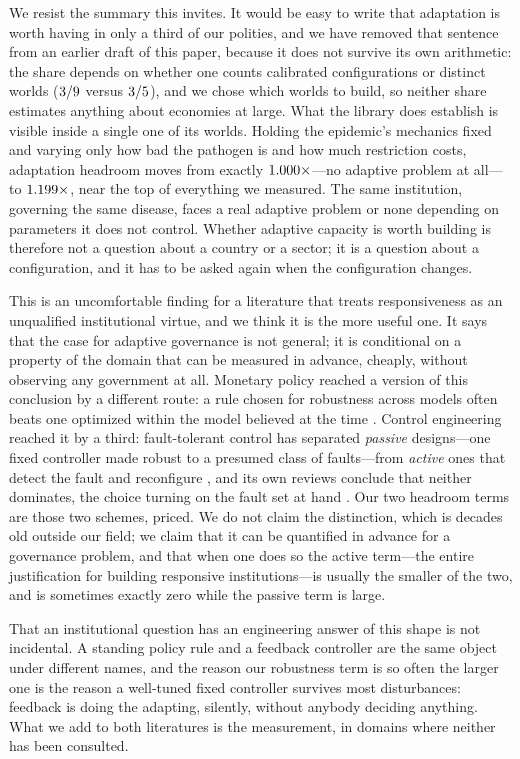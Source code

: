 \documentclass[11pt]{article}
\begin{document}
We resist the summary this invites. It would be easy to write that adaptation is worth having in
only a third of our polities, and we have removed that sentence from an earlier draft of this paper,
because it does not survive its own arithmetic: the share depends on whether one counts calibrated
configurations or distinct worlds ($3/9$ versus $3/5$), and we chose which worlds
to build, so neither share estimates anything about economies at large. What the library does
establish is visible inside a single one of its worlds. Holding the epidemic's mechanics fixed and
varying only how bad the pathogen is and how much restriction costs, adaptation headroom moves from
exactly $1.000\times$---no adaptive problem at all---to $1.199\times$, near the top of
everything we measured. The same institution, governing the same disease, faces a real adaptive
problem or none depending on parameters it does not control. Whether adaptive capacity is worth
building is therefore not a question about a country or a sector; it is a question about a
configuration, and it has to be asked again when the configuration changes.

This is an uncomfortable finding for a literature that treats responsiveness as an unqualified
institutional virtue, and we think it is the more useful one. It says that the case for adaptive
governance is not general; it is conditional on a property of the domain that can be measured in
advance, cheaply, without observing any government at all. Monetary policy reached a version of this
conclusion by a different route: a rule chosen for robustness across models often beats one optimized
within the model believed at the time \citep{levin1999robustness}. Control engineering reached it by
a third: fault-tolerant control has separated \emph{passive} designs---one fixed controller made
robust to a presumed class of faults---from \emph{active} ones that detect the fault and reconfigure
\citep{zhang2008reconfigurable}, and its own reviews conclude that neither dominates, the choice
turning on the fault set at hand \citep{jiang2012comparative}. Our two headroom terms are those two
schemes, priced. We do not claim the distinction, which is decades old outside our field; we claim
that it can be quantified in advance for a governance problem, and that when one does so the active
term---the entire justification for building responsive institutions---is usually the smaller of the
two, and is sometimes exactly zero while the passive term is large.

That an institutional question has an engineering answer of this shape is not incidental. A standing
policy rule and a feedback controller are the same object under different names, and the reason our
robustness term is so often the larger one is the reason a well-tuned fixed controller survives most
disturbances: feedback is doing the adapting, silently, without anybody deciding anything. What we
add to both literatures is the measurement, in domains where neither has been consulted.
\end{document}
